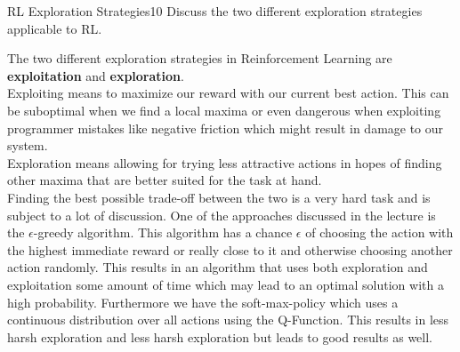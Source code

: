 
\begin{questions}
	

\begin{question}{RL Exploration Strategies}{10}
	Discuss the two different exploration strategies applicable to RL.
	
\begin{answer}
	The two different exploration strategies in Reinforcement Learning are \textbf{exploitation} and \textbf{exploration}.\\ Exploiting means to maximize our reward with our current best action. This can be suboptimal when we find a local maxima or even dangerous when exploiting programmer mistakes like negative friction which might result in damage to our system.\\ Exploration means allowing for trying less attractive actions in hopes of finding other maxima that are better suited for the task at hand.\\ Finding the best possible trade-off between the two is a very hard task and is subject to a lot of discussion. One of the approaches discussed in the lecture is the $\epsilon$-greedy algorithm. This algorithm has a chance $\epsilon$ of choosing the action with the highest immediate reward or really close to it and otherwise choosing another action randomly. This results in an algorithm that uses both exploration and exploitation some amount of time which may lead to an optimal solution with a high probability. Furthermore we have the soft-max-policy which uses a continuous distribution over all actions using the Q-Function. This results in less harsh exploration and less harsh exploration but leads to good results as well.
\end{answer}
\end{question}




\end{questions}